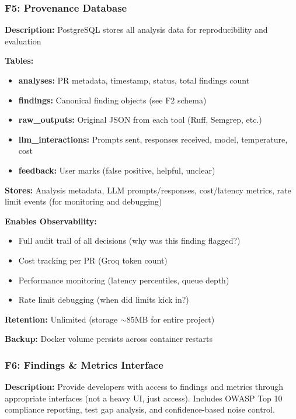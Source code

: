 \documentclass[11pt,a4paper]{article}
\begin{document}
\subsubsection{F5: Provenance Database}
\textbf{Description:} PostgreSQL stores all analysis data for reproducibility and evaluation

\textbf{Tables:}
\begin{itemize}[leftmargin=*]
    \item \textbf{analyses:} PR metadata, timestamp, status, total findings count
    \item \textbf{findings:} Canonical finding objects (see F2 schema)
    \item \textbf{raw\_outputs:} Original JSON from each tool (Ruff, Semgrep, etc.)
    \item \textbf{llm\_interactions:} Prompts sent, responses received, model, temperature, cost
    \item \textbf{feedback:} User marks (false positive, helpful, unclear)
\end{itemize}

\textbf{Stores:} Analysis metadata, LLM prompts/responses, cost/latency metrics, rate limit events (for monitoring and debugging)

\textbf{Enables Observability:}
\begin{itemize}[leftmargin=*]
    \item Full audit trail of all decisions (why was this finding flagged?)
    \item Cost tracking per PR (Groq token count)
    \item Performance monitoring (latency percentiles, queue depth)
    \item Rate limit debugging (when did limits kick in?)
\end{itemize}

\textbf{Retention:} Unlimited (storage $\sim$85MB for entire project)

\textbf{Backup:} Docker volume persists across container restarts

\subsubsection{F6: Findings \& Metrics Interface}
\textbf{Description:} Provide developers with access to findings and metrics through appropriate interfaces (not a heavy UI, just access). Includes OWASP Top 10 compliance reporting, test gap analysis, and confidence-based noise control.
\end{document}
